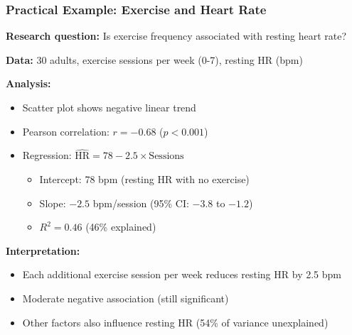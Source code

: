 \documentclass{beamer}
\begin{document}
\begin{frame}
\frametitle{Practical Example: Exercise and Heart Rate}
\textbf{Research question:} Is exercise frequency associated with resting heart rate?

\vspace{0.3cm}
\textbf{Data:} 30 adults, exercise sessions per week (0-7), resting HR (bpm)

\vspace{0.3cm}
\textbf{Analysis:}
\begin{itemize}
\item Scatter plot shows negative linear trend
\item Pearson correlation: $r = -0.68$ ($p < 0.001$)
\item Regression: $\widehat{\text{HR}} = 78 - 2.5 \times \text{Sessions}$
  \begin{itemize}
  \item Intercept: 78 bpm (resting HR with no exercise)
  \item Slope: $-2.5$ bpm/session (95\% CI: $-3.8$ to $-1.2$)
  \item $R^2 = 0.46$ (46\% explained)
  \end{itemize}
\end{itemize}

\vspace{0.3cm}
\textbf{Interpretation:}
\begin{itemize}
\item Each additional exercise session per week reduces resting HR by 2.5 bpm
\item Moderate negative association (still significant)
\item Other factors also influence resting HR (54\% of variance unexplained)
\end{itemize}
\end{frame}
\end{document}
